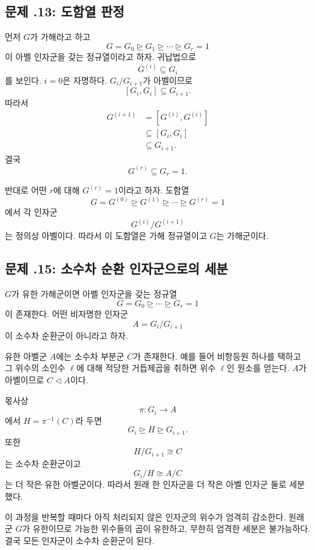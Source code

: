 \subsection*{문제 \thechapter.13: 도함열 판정}

\begin{solution}
먼저 $G$가 가해라고 하고
\[
  G=G_0\trianglerighteq G_1\trianglerighteq\cdots
  \trianglerighteq G_r=1
\]
이 아벨 인자군을 갖는 정규열이라고 하자. 귀납법으로
\[
  G^{(i)}\subseteq G_i
\]
를 보인다. $i=0$은 자명하다. $G_i/G_{i+1}$가 아벨이므로
\[
  [G_i,G_i]\subseteq G_{i+1}.
\]
따라서
\[
\begin{aligned}
  G^{(i+1)}
  &=[G^{(i)},G^{(i)}]\\
  &\subseteq[G_i,G_i]\\
  &\subseteq G_{i+1}.
\end{aligned}
\]
결국
\[
  G^{(r)}\subseteq G_r=1.
\]

반대로 어떤 $r$에 대해 $G^{(r)}=1$이라고 하자. 도함열
\[
  G=G^{(0)}\trianglerighteq G^{(1)}
  \trianglerighteq\cdots\trianglerighteq G^{(r)}=1
\]
에서 각 인자군
\[
  G^{(i)}/G^{(i+1)}
\]
는 정의상 아벨이다. 따라서 이 도함열은 가해 정규열이고 $G$는 가해군이다.
\end{solution}

\subsection*{문제 \thechapter.15: 소수차 순환 인자군으로의 세분}

\begin{solution}
$G$가 유한 가해군이면 아벨 인자군을 갖는 정규열
\[
  G=G_0\trianglerighteq\cdots\trianglerighteq G_r=1
\]
이 존재한다. 어떤 비자명한 인자군
\[
  A=G_i/G_{i+1}
\]
이 소수차 순환군이 아니라고 하자.

유한 아벨군 $A$에는 소수차 부분군 $C$가 존재한다. 예를 들어 비항등원 하나를 택하고 그 위수의 소인수 $\ell$에 대해 적당한 거듭제곱을 취하면 위수 $\ell$인 원소를 얻는다. $A$가 아벨이므로 $C\triangleleft A$이다.

몫사상
\[
  \pi:G_i\to A
\]
에서 $H=\pi^{-1}(C)$라 두면
\[
  G_i\trianglerighteq H\trianglerighteq G_{i+1}.
\]
또한
\[
  H/G_{i+1}\cong C
\]
는 소수차 순환군이고
\[
  G_i/H\cong A/C
\]
는 더 작은 유한 아벨군이다. 따라서 원래 한 인자군을 더 작은 아벨 인자군 둘로 세분했다.

이 과정을 반복할 때마다 아직 처리되지 않은 인자군의 위수가 엄격히 감소한다. 원래 군 $G$가 유한이므로 가능한 위수들의 곱이 유한하고, 무한히 엄격한 세분은 불가능하다. 결국 모든 인자군이 소수차 순환군이 된다.
\end{solution}
